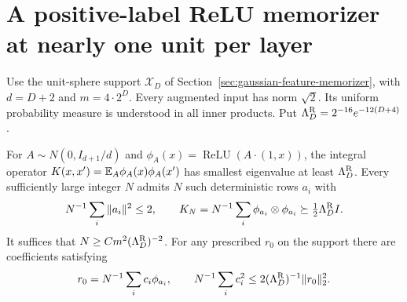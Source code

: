 \section{A positive-label ReLU memorizer at nearly one unit per layer}
\label{sec:relu-near-baseline}
Use the unit-sphere support $\mathcal X_D$ of Section~\ref{sec:gaussian-feature-memorizer}, with $d=D+2$ and $m=4\cdot2^D$. Every augmented input has norm $\sqrt2$. Its uniform probability measure is understood in all inner products. Put $\Lambda_D^{\rm R}=2^{-16}e^{-12(D+4)}$.

\begin{lemma}
For $A\sim N(0,I_{d+1}/d)$ and $\phi_A(x)=\operatorname{ReLU}(A\cdot(1,x))$, the integral operator
$K(x,x')=\mathbb E_A\phi_A(x)\phi_A(x')$
has smallest eigenvalue at least $\Lambda_D^{\rm R}$.
Every sufficiently large integer $N$ admits $N$ such deterministic rows $a_i$ with
\[
 N^{-1}\sum_i\|a_i\|^2\le2,\qquad
 K_N=N^{-1}\sum_i\phi_{a_i}\otimes\phi_{a_i}\succeq\tfrac12\Lambda_D^{\rm R} I.
\]
It suffices that $N\ge C m^2(\Lambda_D^{\rm R})^{-2}$.
For any prescribed $r_0$ on the support there are coefficients satisfying
\[
 r_0=N^{-1}\sum_i c_i\phi_{a_i},\qquad
 N^{-1}\sum_i c_i^2\le2(\Lambda_D^{\rm R})^{-1}\|r_0\|_2^2.
\]
\end{lemma}
